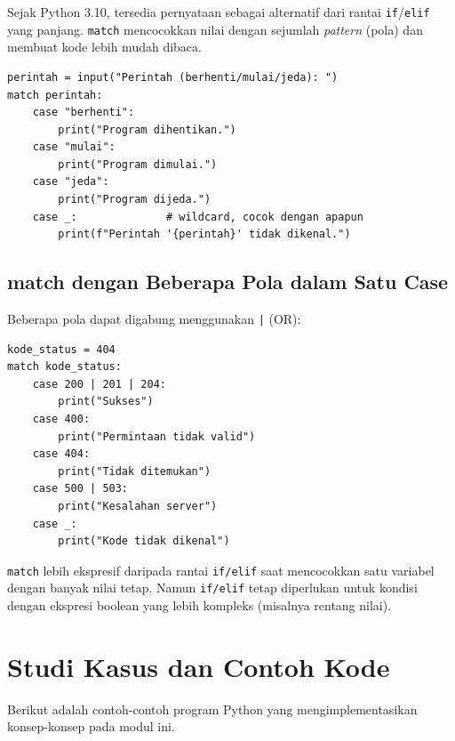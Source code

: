 ﻿\documentclass[../main.tex]{subfiles}
\begin{document}
Sejak Python 3.10, tersedia pernyataan  sebagai alternatif dari rantai \texttt{if}/\texttt{elif} yang panjang. \texttt{match} mencocokkan nilai dengan sejumlah \textit{pattern} (pola) dan membuat kode lebih mudah dibaca.

\begin{lstlisting}[caption=Pernyataan match dasar (Tutorial Python ss4.7)]
perintah = input("Perintah (berhenti/mulai/jeda): ")
match perintah:
    case "berhenti":
        print("Program dihentikan.")
    case "mulai":
        print("Program dimulai.")
    case "jeda":
        print("Program dijeda.")
    case _:              # wildcard, cocok dengan apapun
        print(f"Perintah '{perintah}' tidak dikenal.")
\end{lstlisting}

\subsection{match dengan Beberapa Pola dalam Satu Case}

Beberapa pola dapat digabung menggunakan \texttt{|} (OR):

\begin{lstlisting}[caption=Gabungan pola dengan OR]
kode_status = 404
match kode_status:
    case 200 | 201 | 204:
        print("Sukses")
    case 400:
        print("Permintaan tidak valid")
    case 404:
        print("Tidak ditemukan")
    case 500 | 503:
        print("Kesalahan server")
    case _:
        print("Kode tidak dikenal")
\end{lstlisting}

\begin{konsep}
\texttt{match} lebih ekspresif daripada rantai \texttt{if/elif} saat mencocokkan satu variabel dengan banyak nilai tetap. Namun \texttt{if/elif} tetap diperlukan untuk kondisi dengan ekspresi boolean yang lebih kompleks (misalnya rentang nilai).
\end{konsep}

\section{Studi Kasus dan Contoh Kode}

Berikut adalah contoh-contoh program Python yang mengimplementasikan konsep-konsep pada modul ini.
\end{document}
